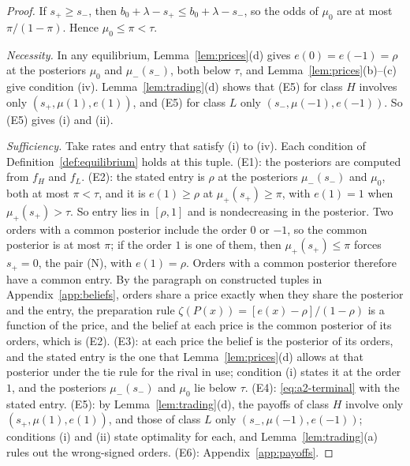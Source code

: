 \begin{proof}
If \(s_+\ge s_-\), then \(b_0+\lambda-s_+\le b_0+\lambda-s_-\), so the odds of \(\mu_0\) are at most \(\pi/(1-\pi)\). Hence
\(\mu_0\le\pi<\tau\).

\emph{Necessity.} In any equilibrium, Lemma~\ref{lem:prices}(d) gives \(e(0)=e(-1)=\rho\) at the posteriors \(\mu_0\)
and \(\mu_-(s_-)\), both below \(\tau\), and Lemma~\ref{lem:prices}(b)--(c) give condition (iv).
Lemma~\ref{lem:trading}(d) shows that (E5) for class \(H\) involves only \((s_+,\mu(1),e(1))\), and (E5) for class
\(L\) only \((s_-,\mu(-1),e(-1))\). So (E5) gives (i) and (ii).

\emph{Sufficiency.} Take rates and entry that satisfy (i) to (iv). Each condition of
Definition~\ref{def:equilibrium} holds at this tuple. (E1): the posteriors are computed from \(f_H\) and \(f_L\).
(E2): the stated entry is \(\rho\) at the posteriors \(\mu_-(s_-)\) and \(\mu_0\), both at most \(\pi<\tau\), and it is
\(e(1)\ge\rho\) at \(\mu_+(s_+)\ge\pi\), with \(e(1)=1\) when \(\mu_+(s_+)>\tau\). So entry lies in \([\rho,1]\) and is
nondecreasing in the posterior. Two orders with a common posterior include the order \(0\) or \(-1\), so the common
posterior is at most \(\pi\); if the order \(1\) is one of them, then \(\mu_+(s_+)\le\pi\) forces \(s_+=0\), the pair
(N), with \(e(1)=\rho\). Orders with a common posterior therefore have a common entry. By the paragraph on
constructed tuples in Appendix~\ref{app:beliefs}, orders share a price exactly when they share the posterior and
the entry, the preparation rule \(\zeta(P(x))=[e(x)-\rho]/(1-\rho)\) is a function of the price, and the belief at
each price is the common posterior of its orders, which is (E2). (E3): at each price the belief is the posterior of
its orders, and the stated entry is the one that Lemma~\ref{lem:prices}(d) allows at that posterior under the tie rule for the rival in use; condition (i) states it at the order \(1\), and the posteriors \(\mu_-(s_-)\) and \(\mu_0\)
lie below \(\tau\). (E4): \eqref{eq:a2-terminal} with the stated entry. (E5): by Lemma~\ref{lem:trading}(d), the
payoffs of class \(H\) involve only \((s_+,\mu(1),e(1))\), and those of class \(L\) only \((s_-,\mu(-1),e(-1))\);
conditions (i) and (ii) state optimality for each, and Lemma~\ref{lem:trading}(a) rules out the wrong-signed
orders. (E6): Appendix~\ref{app:payoffs}.
\end{proof}

